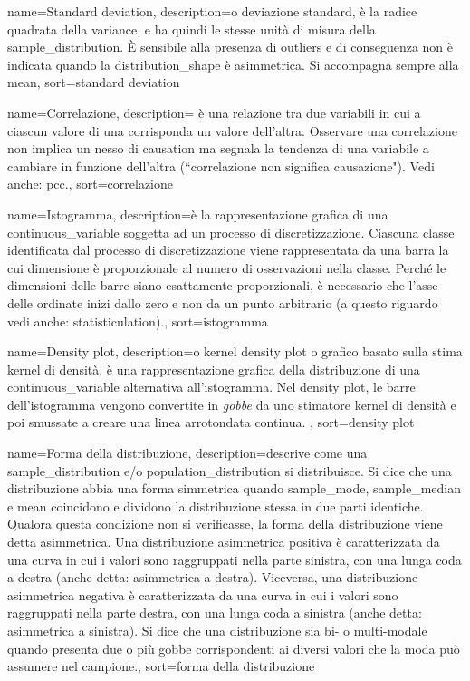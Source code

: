 {
	 name={Standard deviation},
	 description={o deviazione standard, \`e la radice quadrata della \gls{variance}, e ha quindi le stesse unit\`a di misura della \gls{sample_distribution}. \`E sensibile alla presenza di \gls{outliers} e di conseguenza non \`e indicata quando la \gls{distribution_shape} \`e asimmetrica. Si accompagna sempre alla \gls{mean}},
	 sort={standard deviation}
}

{
	 name={Correlazione},
	 description={
	 \`e una relazione tra due variabili  in cui a ciascun valore di una corrisponda un valore dell'altra. Osservare una correlazione non implica un nesso di \gls{causation} ma segnala la tendenza di una variabile a cambiare in funzione dell'altra (``correlazione non significa causazione"). Vedi anche: \gls{pcc}.},
	 sort={correlazione}
}

{
	 name={Istogramma},
	 description={\`e la rappresentazione grafica di una \gls{continuous_variable} soggetta ad un processo di \gls{discretizzazione}. Ciascuna classe identificata dal processo di discretizzazione viene rappresentata da una barra la cui dimensione \`e proporzionale al numero di osservazioni nella classe. Perch\'e le dimensioni delle barre siano esattamente proporzionali, \`e necessario che l'asse delle ordinate inizi dallo zero e non da un punto arbitrario (a questo riguardo vedi anche: \gls{statisticulation}).},
	 sort={istogramma}
}

{
	 name={Density plot},
	 description={o kernel density plot o grafico basato sulla stima kernel di densit\`a,  \`e una rappresentazione grafica della distribuzione di una \gls{continuous_variable} alternativa all'\gls{istogramma}. Nel density plot, le barre dell'istogramma vengono convertite in \emph{gobbe} da uno stimatore kernel di densit\`a e  poi smussate a creare una linea arrotondata continua. },
	 sort={density plot}
}

{
	 name={Forma della distribuzione},
	 description={descrive come una \gls{sample_distribution} e/o \gls{population_distribution} si distribuisce. Si dice che una distribuzione abbia una forma simmetrica quando \gls{sample_mode}, \gls{sample_median} e \gls{mean} coincidono e dividono la distribuzione stessa in due parti identiche. Qualora questa condizione non si verificasse, la forma della distribuzione viene detta asimmetrica. Una distribuzione asimmetrica positiva \`e caratterizzata da una curva in cui i valori sono raggruppati nella
parte sinistra, con una lunga coda a destra (anche detta: asimmetrica a destra). Viceversa, una distribuzione asimmetrica negativa \`e caratterizzata da una curva in cui i valori sono raggruppati nella parte destra, con una lunga coda a sinistra (anche detta: asimmetrica a sinistra). Si dice che una distribuzione sia bi- o multi-modale quando presenta due o pi\`u gobbe corrispondenti ai diversi valori che la moda pu\`o assumere nel campione.},
	 sort={forma della distribuzione}
}

